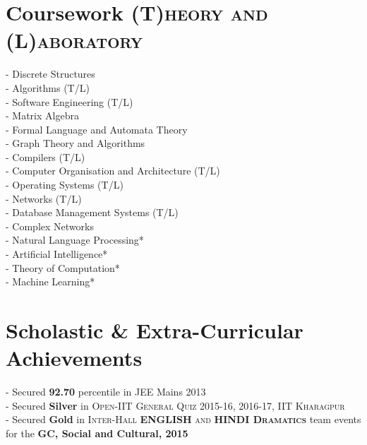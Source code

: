 \documentclass[a4paper,10pt]{extarticle} %
\begin{document}
\section{Coursework
\hfill\small\textsc{(T)heory and (L)aboratory}}
\begin{multicols}{2}
- Discrete Structures \\
- Algorithms (T/L)  \\
- Software Engineering (T/L) \\
- Matrix Algebra \\
- Formal Language and Automata Theory \\ 
- Graph Theory and Algorithms \\
- Compilers (T/L) \\
- Computer Organisation and Architecture (T/L) \\
- Operating Systems (T/L) \\
- Networks (T/L) \\
- Database Management Systems (T/L) \\
- Complex Networks \\
- Natural Language Processing* \\
- Artificial Intelligence*\\
- Theory of Computation* \\
- Machine Learning* \\
\end{multicols}

\section{Scholastic \& Extra-Curricular Achievements}

{- Secured \textbf{92.70} percentile in JEE Mains 2013}\\
{- Secured \textbf{Silver} in \textsc{Open-IIT General Quiz 2015-16, 2016-17, IIT Kharagpur}}\\
{- Secured \textbf{Gold} in \textsc{Inter-Hall \textbf{ENGLISH} and \textbf{HINDI Dramatics}} team events for the \textbf{GC, Social and Cultural, 2015}}



\end{document}
